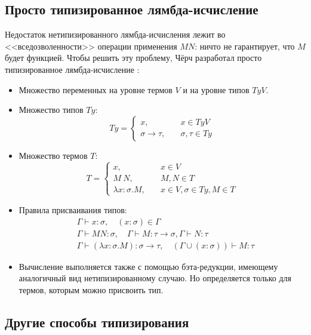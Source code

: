 \subsection{Просто типизированное лямбда-исчисление}

Недостаток нетипизированного лямбда-исчисления лежит во <<вседозволенности>>
операции применения \(M N\): ничто не гарантирует, что \(M\) будет функцией.
Чтобы решить эту проблему, Чёрч разработал просто типизированное лямбда-исчисление
\cite{lambda-calculi-with-types}:
\begin{itemize}
\item Множество переменных на уровне термов \(V\) и на уровне типов \(TyV\).
\item Множество типов \(Ty\):
   \[
   Ty = \left\{
   \begin{array}{lr}
   x,\quad& x \in TyV\\
   \sigma \rightarrow \tau,\quad& \sigma, \tau \in Ty
   \end{array}
   \right.
   \]
\item Множество термов \(T\):
   \[
   T = \left\{
   \begin{array}{lr}
   x,\quad& x \in V\\
   M\ N,\quad& M, N \in T\\
   \lambda x : \sigma. M,\quad& x \in V, \sigma \in Ty, M \in T
   \end{array}
   \right.
   \]
\item Правила присваивания типов:
   \begin{align*}
   &\Gamma \vdash x : \sigma,\quad (x : \sigma) \in \Gamma\\
   &\Gamma \vdash M N : \sigma,\quad \Gamma \vdash M : \tau \rightarrow \sigma,
      \Gamma \vdash N : \tau\\
   &\Gamma \vdash (\lambda x : \sigma. M) : \sigma \rightarrow \tau,\quad
      (\Gamma \cup (x : \sigma)) \vdash M : \tau
   \end{align*}
\item Вычисление выполняется также с помощью бэта-редукции, имеющему
   аналогичный вид нетипизированному случаю. Но определяется только
   для термов, которым можно присвоить тип.
\end{itemize}

\subsection{Другие способы типизирования}

